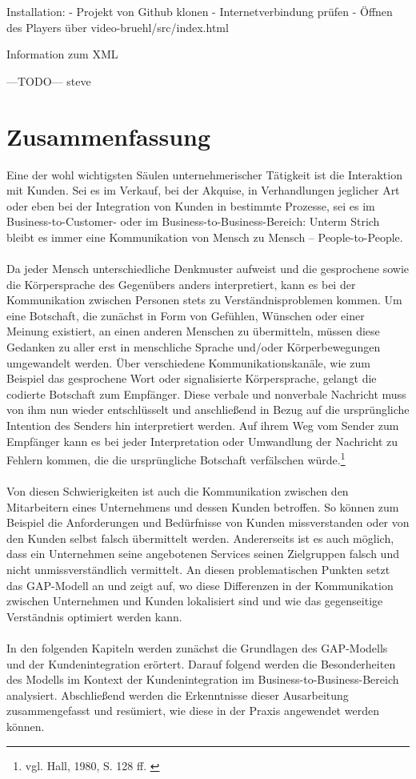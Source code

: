 Installation:
- Projekt von Github klonen
- Internetverbindung prüfen
- Öffnen des Players über video-bruehl/src/index.html

Information zum XML

---TODO--- steve

\chapter{Zusammenfassung}




\label{kapitel1}
Eine der wohl wichtigsten Säulen unternehmerischer Tätigkeit ist die Interaktion mit Kunden. Sei es im Verkauf, bei der Akquise, in Verhandlungen jeglicher Art oder eben bei der Integration von Kunden in bestimmte Prozesse, sei es im Business-to-Customer- oder im Business-to-Business-Bereich: Unterm Strich bleibt es immer eine Kommunikation von Mensch zu Mensch -- People-to-People.
\\ \\
Da jeder Mensch unterschiedliche Denkmuster aufweist und die gesprochene sowie die Körpersprache des Gegenübers anders interpretiert, kann es bei der Kommunikation zwischen Personen stets zu Verständnisproblemen kommen. Um eine Botschaft, die zunächst in Form von Gefühlen, Wünschen oder einer Meinung existiert, an einen anderen Menschen zu übermitteln, müssen diese Gedanken zu aller erst in menschliche Sprache und/oder Körperbewegungen umgewandelt werden. Über verschiedene Kommunikationskanäle, wie zum Beispiel das gesprochene Wort oder signalisierte Körpersprache, gelangt die codierte Botschaft zum Empfänger. Diese verbale und nonverbale Nachricht muss von ihm nun wieder entschlüsselt und anschließend in Bezug auf die ursprüngliche Intention des Senders hin interpretiert werden. Auf ihrem Weg vom Sender zum Empfänger kann es bei jeder Interpretation oder Umwandlung der Nachricht zu Fehlern kommen, die die ursprüngliche Botschaft verfälschen würde.\footnote{vgl. Hall, 1980, S. 128 ff. \cite{Hall1980}}
\\ \\
Von diesen Schwierigkeiten ist auch die Kommunikation zwischen den Mitarbeitern eines Unternehmens und dessen Kunden betroffen. So können zum Beispiel die Anforderungen und Bedürfnisse von Kunden missverstanden oder von den Kunden selbst falsch übermittelt werden. Andererseits ist es auch möglich, dass ein Unternehmen seine angebotenen Services seinen Zielgruppen falsch und nicht unmissverständlich vermittelt. An diesen problematischen Punkten setzt das GAP-Modell an und zeigt auf, wo diese Differenzen in der Kommunikation zwischen Unternehmen und Kunden lokalisiert sind und wie das gegenseitige Verständnis optimiert werden kann.
\\ \\
In den folgenden Kapiteln werden zunächst die Grundlagen des GAP-Modells und der Kundenintegration erörtert. Darauf folgend werden die Besonderheiten des Modells im Kontext der Kundenintegration im Business-to-Business-Bereich analysiert. Abschließend werden die Erkenntnisse dieser Ausarbeitung zusammengefasst und resümiert, wie diese in der Praxis angewendet werden können.



